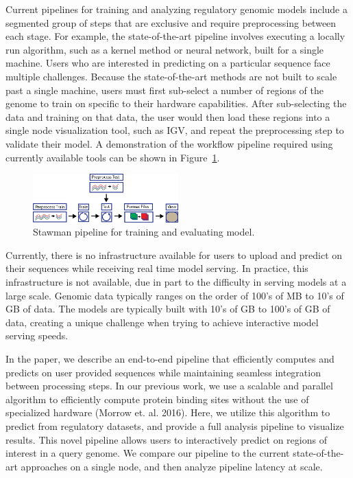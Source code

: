 \documentclass{sig-alternate-05-2015}
\begin{document}
Current pipelines for training and analyzing regulatory genomic models include a segmented group of steps that are exclusive and require preprocessing between each stage. For example, the state-of-the-art pipeline involves executing a locally run algorithm, such as a kernel method or neural network, built for a single machine. Users who are interested in predicting on a particular sequence face multiple challenges. Because the state-of-the-art methods are not built to scale past a single machine, users must first sub-select a number of regions of the genome to train on specific to their hardware capabilities. After sub-selecting the data and training on that data, the user would then load these regions into a single node visualization tool, such as IGV, and repeat the preprocessing step to validate their model. A demonstration of the workflow pipeline required using currently available tools can be shown in Figure~\ref{fig:strawmanPipeline}.

\begin{figure}[b]
  \label{fig:strawmanPipeline}
  \includegraphics[width=0.5\textwidth]{figures/strawman.png}
  \caption{Stawman pipeline for training and evaluating model.}
\end{figure}

Currently, there is no infrastructure available for users to upload and predict on their sequences while receiving real time model serving. In practice, this infrastructure is not available, due in part to the difficulty in serving models at a large scale. Genomic data typically ranges on the order of 100's of MB to 10's of GB of data. The models are typically built with 10's of GB to 100's of GB of data, creating a unique challenge when trying to achieve interactive model serving speeds. 

In the paper, we describe an end-to-end pipeline that efficiently computes and predicts on user provided sequences while maintaining seamless integration between processing steps. In our previous work, we use a scalable and parallel algorithm to efficiently compute protein binding sites without the use of specialized hardware (Morrow et. al. 2016). Here, we utilize this algorithm to predict from regulatory datasets, and provide a full analysis pipeline to visualize results. This novel pipeline allows users to interactively predict on regions of interest in a query genome. We compare our pipeline to the current state-of-the-art approaches on a single node, and then analyze pipeline latency at scale. \\
\end{document}
